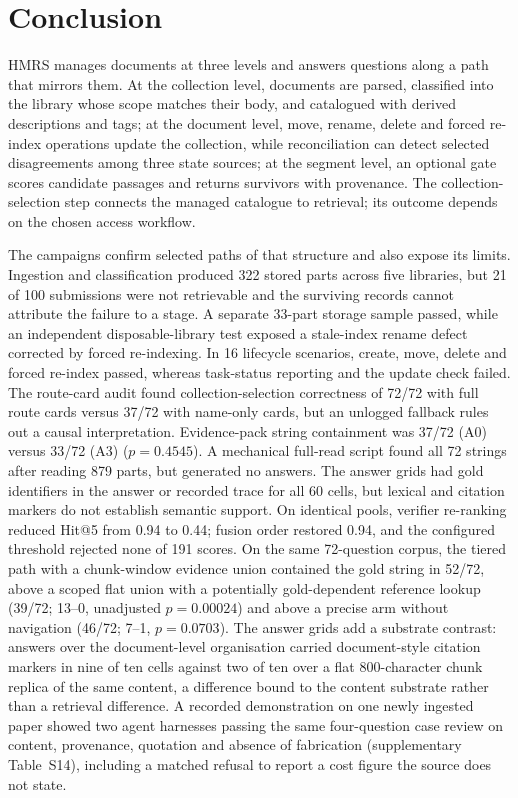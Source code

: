 \section{Conclusion}
\label{sec:conclusion}

HMRS manages documents at three levels and answers questions along a path that
mirrors them. At the collection level, documents are parsed, classified into
the library whose scope matches their body, and catalogued with derived
descriptions and tags; at the document level, move, rename, delete and forced
re-index operations update the collection, while reconciliation can detect
selected disagreements among three state sources; at the segment level, an
optional gate scores candidate passages and returns survivors with provenance.
The collection-selection step connects the managed catalogue to retrieval;
its outcome depends on the chosen access workflow.

The campaigns confirm selected paths of that structure and also expose its
limits. Ingestion and classification produced 322 stored parts across five
libraries, but 21 of 100 submissions were not retrievable and the surviving
records cannot attribute the failure to a stage. A separate 33-part storage
sample passed, while an independent disposable-library test exposed a
stale-index rename defect corrected by forced re-indexing. In 16 lifecycle
scenarios, create, move, delete and forced re-index passed, whereas task-status
reporting and the update check failed. The route-card audit found
collection-selection correctness of 72/72 with full route cards versus 37/72
with name-only cards, but an unlogged fallback
rules out a causal interpretation. Evidence-pack string containment was
37/72 (A0) versus 33/72 (A3) ($p=0.4545$). A mechanical full-read script found all 72
strings after reading 879 parts, but generated no answers. The answer grids had
gold identifiers in the answer or recorded trace for all 60 cells, but lexical and citation markers do not
establish semantic support. On identical pools, verifier re-ranking reduced
Hit@5 from 0.94 to 0.44; fusion order restored 0.94, and the configured
threshold rejected none of 191 scores. On the same 72-question corpus, the
tiered path with a chunk-window evidence union contained the gold string in
52/72, above a scoped flat union with a potentially gold-dependent reference
lookup (39/72; 13--0, unadjusted $p=0.00024$) and above a precise arm without navigation (46/72;
7--1, $p=0.0703$). The answer grids add a substrate contrast: answers over the
document-level organisation carried document-style citation markers in nine
of ten cells against two of ten over a flat 800-character chunk replica of
the same content, a difference bound to the content substrate rather than a
retrieval difference. A recorded demonstration on one newly ingested paper showed two
agent harnesses passing the same four-question case review on content,
provenance, quotation and absence of fabrication (supplementary Table~S14),
including a matched refusal to report a cost figure the source does not state.

